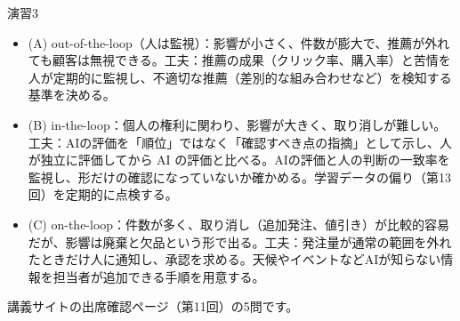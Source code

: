 \begin{answer}{演習3}
\begin{itemize}
  \item (A) out-of-the-loop（人は監視）：影響が小さく、件数が膨大で、推薦が外れても顧客は無視できる。工夫：推薦の成果（クリック率、購入率）と苦情を人が定期的に監視し、不適切な推薦（差別的な組み合わせなど）を検知する基準を決める。
  \item (B) in-the-loop：個人の権利に関わり、影響が大きく、取り消しが難しい。工夫：AIの評価を「順位」ではなく「確認すべき点の指摘」として示し、人が独立に評価してから AI の評価と比べる。AIの評価と人の判断の一致率を監視し、形だけの確認になっていないか確かめる。学習データの偏り（第13回）を定期的に点検する。
  \item (C) on-the-loop：件数が多く、取り消し（追加発注、値引き）が比較的容易だが、影響は廃棄と欠品という形で出る。工夫：発注量が通常の範囲を外れたときだけ人に通知し、承認を求める。天候やイベントなどAIが知らない情報を担当者が追加できる手順を用意する。
\end{itemize}
\end{answer}

講義サイトの出席確認ページ（第11回）の5問です。

